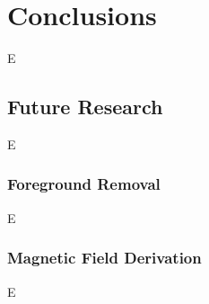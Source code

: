 \chapter{Conclusions}
\label{cha:conclusion}

E

\section{Future Research}
\label{sec:future}

E

\subsection{Foreground Removal}
\label{ssec:fr_conclusion}

E

\subsection{Magnetic Field Derivation}
\label{ssec:mag_conclusion}

E

